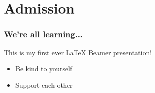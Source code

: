\documentclass{beamer}
\begin{document}

\section{Admission}


\begin{frame}
    \frametitle{We're all learning...}

    This is my first ever \LaTeX{} Beamer presentation!
    
    \bigskip
    
    \begin{itemize}
        \item Be kind to yourself
        \item Support each other
    \end{itemize}


\end{frame}
\end{document}
